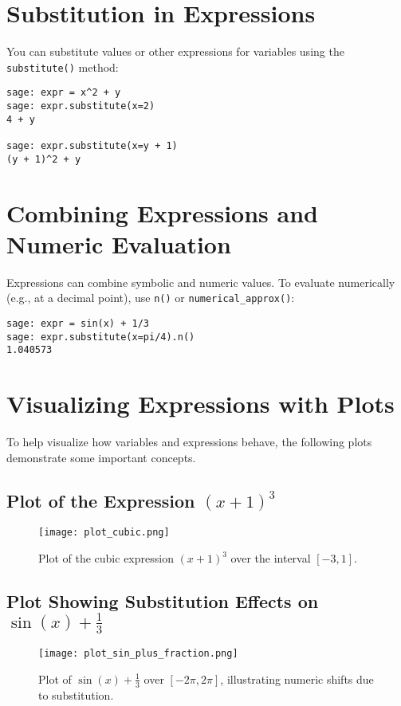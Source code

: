 \documentclass[12pt]{book}
\begin{document}
\section{Substitution in Expressions}

You can substitute values or other expressions for variables using the \texttt{substitute()} method:

\begin{verbatim}
sage: expr = x^2 + y
sage: expr.substitute(x=2)
4 + y

sage: expr.substitute(x=y + 1)
(y + 1)^2 + y
\end{verbatim}

\section{Combining Expressions and Numeric Evaluation}

Expressions can combine symbolic and numeric values. To evaluate numerically (e.g., at a decimal point), use \texttt{n()} or \texttt{numerical\_approx()}:

\begin{verbatim}
sage: expr = sin(x) + 1/3
sage: expr.substitute(x=pi/4).n()
1.040573
\end{verbatim}

\section{Visualizing Expressions with Plots}

To help visualize how variables and expressions behave, the following plots demonstrate some important concepts.

\subsection{Plot of the Expression \( (x + 1)^3 \)}
\begin{figure}[h]
  \centering
  \texttt{[image: plot\_cubic.png]}
  \caption{Plot of the cubic expression \( (x + 1)^3 \) over the interval \([-3, 1]\).}
  \label{fig:plot_cubic}
\end{figure}

\subsection{Plot Showing Substitution Effects on \( \sin(x) + \frac{1}{3} \)}

\begin{figure}[H]
  \centering
  \texttt{[image: plot\_sin\_plus\_fraction.png]}
  \caption{Plot of \( \sin(x) + \frac{1}{3} \) over \([-2\pi, 2\pi]\), illustrating numeric shifts due to substitution.}
  \label{fig:plot_sin_plus_fraction}
\end{figure}
\end{document}
